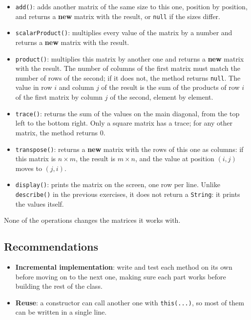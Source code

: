 \begin{itemize}
        \begin{itemize}

            \item \texttt{add()}: adds another matrix of the same size to this one, position by position, and returns a \textbf{new} matrix with the result, or \texttt{null} if the sizes differ.

            \item \texttt{scalarProduct()}: multiplies every value of the matrix by a number and returns a \textbf{new} matrix with the result.

            \item \texttt{product()}: multiplies this matrix by another one and returns a \textbf{new} matrix with the result. The number of columns of the first matrix must match the number of rows of the second; if it does not, the method returns \texttt{null}. The value in row \(i\) and column \(j\) of the result is the sum of the products of row \(i\) of the first matrix by column \(j\) of the second, element by element.

            \item \texttt{trace()}: returns the sum of the values on the main diagonal, from the top left to the bottom right. Only a square matrix has a trace; for any other matrix, the method returns 0.

            \item \texttt{transpose()}: returns a \textbf{new} matrix with the rows of this one as columns: if this matrix is \(n \times m\), the result is \(m \times n\), and the value at position \((i, j)\) moves to \((j, i)\).

            \item \texttt{display()}: prints the matrix on the screen, one row per line. Unlike \texttt{describe()} in the previous exercises, it does not return a \texttt{String}: it prints the values itself.

        \end{itemize}

\end{itemize}

None of the operations changes the matrices it works with.

\subsection{Recommendations}

\begin{itemize}

    \item \textbf{Incremental implementation}: write and test each method on its own before moving on to the next one, making sure each part works before building the rest of the class.

    \item \textbf{Reuse}: a constructor can call another one with \texttt{this(...)}, so most of them can be written in a single line.

\end{itemize}

